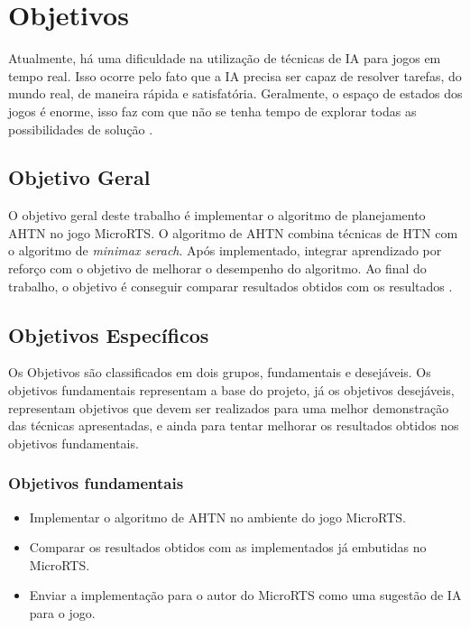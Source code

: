 \chapter{\label{chap:obje}Objetivos}

Atualmente, há uma dificuldade na utilização de técnicas de IA para jogos em tempo real. Isso ocorre pelo fato que a IA precisa ser capaz de resolver tarefas, do mundo real, de maneira rápida e satisfatória. Geralmente, o espaço de estados dos jogos é enorme, isso faz com que não se tenha tempo de explorar todas as possibilidades de solução \cite{millington2009artificial}.   

\section{Objetivo Geral}
O objetivo geral deste trabalho é implementar o algoritmo de planejamento AHTN \cite{ontanon2015adversarial} no jogo MicroRTS. O algoritmo de AHTN combina técnicas de HTN com o algoritmo de \textit{minimax serach}. Após implementado, integrar aprendizado por reforço com o objetivo de melhorar o desempenho do algoritmo. Ao final do trabalho, o objetivo é conseguir comparar resultados obtidos com os resultados \cite{ontanon2012experiments,hogg2010learning,ontanon2013survey}. 

\section{Objetivos Específicos}\label{obj:esp}
Os Objetivos são classificados em dois grupos, fundamentais e desejáveis. Os objetivos fundamentais representam a base do projeto, já os objetivos desejáveis, representam objetivos que devem ser realizados para uma melhor demonstração das técnicas apresentadas, e ainda para tentar melhorar os resultados obtidos nos objetivos fundamentais. 
 
\subsection{Objetivos fundamentais} 
\begin{itemize}
	\item Implementar o algoritmo de AHTN no ambiente do jogo MicroRTS.
	\item Comparar os resultados obtidos com as implementados já embutidas no MicroRTS.
	\item Enviar a implementação para o autor do MicroRTS como uma sugestão de IA para o jogo.
\end{itemize}
 
